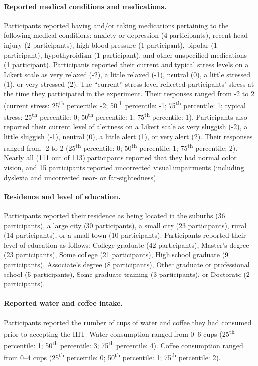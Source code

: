 \documentclass[10pt]{article}
\begin{document}
\paragraph{Reported medical conditions and medications.}
Participants reported having and/or taking medications pertaining to the following medical conditions: anxiety or
depression (4 participants), recent head injury (2 participants), high
blood pressure (1 participant), bipolar (1 participant),
hypothyroidism (1 participant), and other unspecified medications (1
participant).  Participants reported their current and typical stress
levels on a Likert scale as very relaxed (-2), a little relaxed (-1),
neutral (0), a little stressed (1), or very stressed (2).  The
``current'' stress level reflected participants' stress at the time
they participated in the experiment.
Their responses
ranged from -2 to 2 (current stress: 25\textsuperscript{th} percentile: -2;
50\textsuperscript{th} percentile: -1; 75\textsuperscript{th}
percentile: 1; typical stress: 25\textsuperscript{th} percentile: 0;
50\textsuperscript{th} percentile: 1; 75\textsuperscript{th}
percentile: 1).  Participants also reported their current level of
alertness on a Likert scale as very sluggish (-2), a little sluggish
(-1), neutral (0), a little alert (1), or very alert (2).  Their
responses ranged from -2 to 2 (25\textsuperscript{th} percentile: 0;
50\textsuperscript{th} percentile: 1; 75\textsuperscript{th}
percentile: 2).  Nearly all (111 out of 113) participants reported
that they had normal color vision, and 15 participants reported
uncorrected visual impairments (including dyslexia and uncorrected
near- or far-sightedness).

\paragraph{Residence and level of education.}
Participants reported their residence
as being located in the suburbs (36 participants), a large city (30
participants), a small city (23 participants), rural (14
participants), or a small town (10 participants).  Participants
reported their level of education as follows: College graduate (42
participants), Master's degree (23 participants), Some college (21
participants), High school graduate (9 participants), Associate's
degree (8 participants), Other graduate or professional school (5
participants), Some graduate training (3 participants), or Doctorate
(2 participants).

\paragraph{Reported water and coffee intake.}
Participants reported the number of cups of water and coffee they had
consumed prior to accepting the HIT.  Water consumption ranged from
0--6 cups (25\textsuperscript{th} percentile: 1;
50\textsuperscript{th} percentile: 3; 75\textsuperscript{th}
percentile: 4).  Coffee consumption ranged from 0--4 cups (25\textsuperscript{th} percentile: 0;
50\textsuperscript{th} percentile: 1; 75\textsuperscript{th}
percentile: 2).
\end{document}
